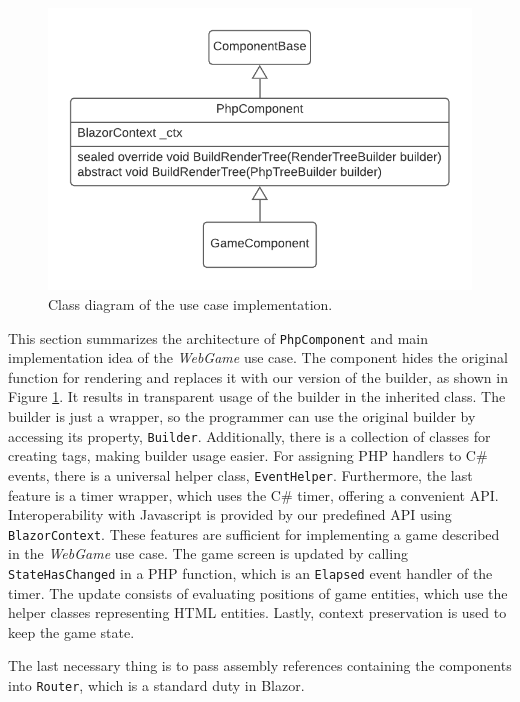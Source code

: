 \begin{figure}[t!]
\centering
\includegraphics[scale=0.8]{./img/PhpComponentSolution}
\caption{Class diagram of the use case implementation.}
\label{img17:solution}
\end{figure}
\par
This section summarizes the architecture of \texttt{PhpComponent} and main implementation idea of the \textit{WebGame} use case.
The component hides the original function for rendering and replaces it with our version of the builder, as shown in Figure \ref{img17:solution}.
It results in transparent usage of the builder in the inherited class.
The builder is just a wrapper, so the programmer can use the original builder by accessing its property, \texttt{Builder}.
Additionally, there is a collection of classes for creating tags, making builder usage easier.
For assigning PHP handlers to C\# events, there is a universal helper class, \texttt{EventHelper}.
Furthermore, the last feature is a timer wrapper, which uses the C\# timer, offering a convenient API.
Interoperability with Javascript is provided by our predefined API using \texttt{BlazorContext}.
These features are sufficient for implementing a game described in the \textit{WebGame} use case.
The game screen is updated by calling \texttt{StateHasChanged} in a PHP function, which is an \texttt{Elapsed} event handler of the timer. 
The update consists of evaluating positions of game entities, which use the helper classes representing HTML entities.
Lastly, context preservation is used to keep the game state.
\par
The last necessary thing is to pass assembly references containing the components into \texttt{Router}, which is a standard duty in Blazor.


